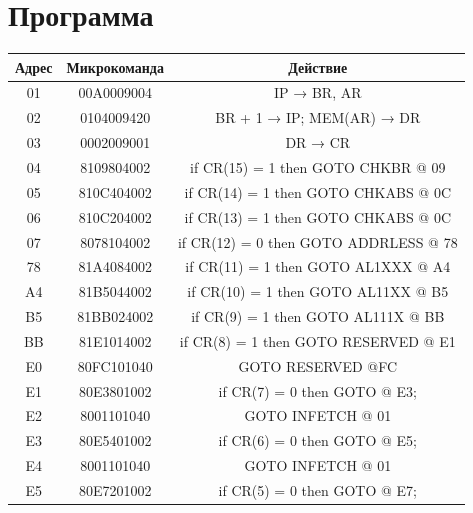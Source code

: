 \section{Программа}
\begin{center}
    \begin{tabular}{|c|c|c|}
        \hline
        Адрес & Микрокоманда & Действие                              \\
        \hline
        01    & 00A0009004   & IP → BR, AR                           \\
        \hline
        02    & 0104009420   & BR + 1 → IP; MEM(AR) → DR             \\
        \hline
        03    & 0002009001   & DR → CR                               \\
        \hline
        04    & 8109804002   & if CR(15) = 1 then GOTO CHKBR @ 09    \\
        \hline
        05    & 810C404002   & if CR(14) = 1 then GOTO CHKABS @ 0C   \\
        \hline
        06    & 810C204002   & if CR(13) = 1 then GOTO CHKABS @ 0C   \\
        \hline
        07    & 8078104002   & if CR(12) = 0 then GOTO ADDRLESS @ 78 \\
        \hline
        78    & 81A4084002   & if CR(11) = 1 then GOTO AL1XXX @ A4   \\
        \hline
        A4    & 81B5044002   & if CR(10) = 1 then GOTO AL11XX @ B5   \\
        \hline
        B5    & 81BB024002   & if CR(9) = 1 then GOTO AL111X @ BB    \\
        \hline
        BB    & 81E1014002   & if CR(8) = 1 then GOTO RESERVED @ E1  \\
        \hline
        E0    & 80FC101040   & GOTO RESERVED @FC                     \\
        \hline
        E1    & 80E3801002   & if CR(7) = 0 then GOTO @ E3;          \\
        \hline
        E2    & 8001101040   & GOTO INFETCH @ 01                     \\
        \hline
        E3    & 80E5401002   & if CR(6) = 0 then GOTO @ E5;          \\
        \hline
        E4    & 8001101040   & GOTO INFETCH @ 01                     \\
        \hline
        E5    & 80E7201002   & if CR(5) = 0 then GOTO @ E7;          \\
        \hline

\end{tabular}
\end{center}
